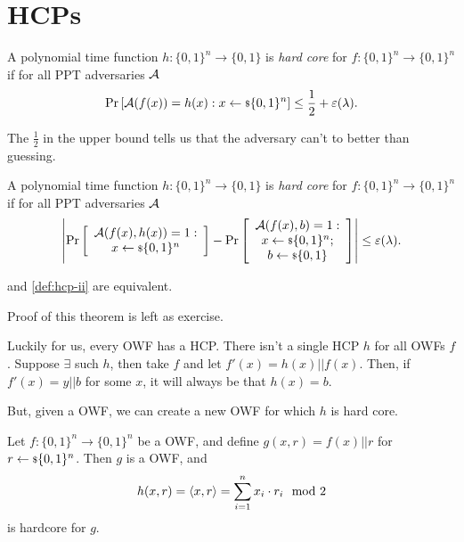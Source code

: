 \section{\aclp{HCP}}

\begin{definition} \label{def:hcp-i}
	A polynomial time function $h : \{0,1\}^{n} \to \{0,1\}$ is \emph{hard core} for $f : \{0,1\}^{n} \to \{0,1\}^{n}$ if for all \ac{PPT} adversaries $\mathcal{A}$
	\begin{equation*}
		\mathop{\mathrm{Pr}}\limits_{} \left[ {\mathcal{A}(f(x)) = h(x) : x \leftarrow {\scriptstyle \$} {\{0,1\}^{n}}} \right] \le \frac{1}{2} + \varepsilon(\lambda).
	\end{equation*}
\end{definition}
The $\frac{1}{2}$ in the upper bound tells us that the adversary can't to better than guessing.

\begin{definition} \label{def:hcp-ii}
	A polynomial time function $h : \{0,1\}^{n} \to \{0,1\}$ is \emph{hard core} for $f : \{0,1\}^{n} \to \{0,1\}^{n}$ if for all \ac{PPT} adversaries $\mathcal{A}$
	\begin{equation*}
		\left|{
			\mathop{\mathrm{Pr}}\limits_{} \left[ {
			\begin{array}{c}
				\mathcal{A}(f(x), h(x)) = 1 : \\
				x \leftarrow {\scriptstyle \$} {\{0,1\}^{n}}
			\end{array}
			} \right]
			-
			\mathop{\mathrm{Pr}}\limits_{} \left[ {
			\begin{array}{c}
				\mathcal{A}(f(x), b) = 1 : \\
				x \leftarrow {\scriptstyle \$} {\{0,1\}^{n}}; \\
				b \leftarrow {\scriptstyle \$} {\{0,1\}}
			\end{array}
			} \right]
		}\right|
		\le
		\varepsilon(\lambda).
	\end{equation*}
\end{definition}

\begin{theorem}
	 and \cref{def:hcp-ii} are equivalent.
\end{theorem}
Proof of this theorem is left as exercise.

Luckily for us, every \ac{OWF} has a \ac{HCP}.
There isn't a single \ac{HCP} $h$ for all \acp{OWF} $f$.
Suppose $\exists$ such $h$, then take $f$ and let $f'(x) = h(x) || f(x)$.
Then, if $f'(x) = y || b$ for some $x$, it will always be that $h(x) = b$.

But, given a \ac{OWF}, we can create a new \ac{OWF} for which $h$ is hard core.

\begin{theorem}[\ac{GL}, 1983] \label{thm:gl}
	Let $f : \{0,1\}^n \to \{0,1\}^{n}$ be a \ac{OWF}, and define $g(x,r) = f(x) || r$ for $r \leftarrow {\scriptstyle \$} {\{0,1\}^{n}}$.
	Then $g$ is a \ac{OWF}, and 
	\begin{equation*}
		h(x,r) = \left< {x}, {r} \right> = \sum_{i=1}^{n} x_i \cdot r_i \mod 2
	\end{equation*}
	is hardcore for $g$. 
\end{theorem}

